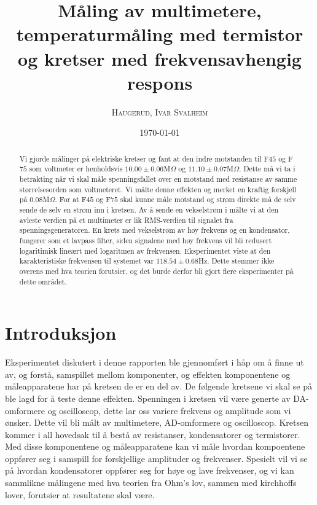 \documentclass[%
 reprint,
 amsmath,amssymb,
 aps,
]{revtex4-1}
\begin{document}

\title{Måling av multimetere, temperaturmåling med termistor\\ og kretser med frekvensavhengig respons}

\author{\textsc{Haugerud, Ivar Svalheim}}
%

\date{\today}

\begin{abstract}
Vi gjorde målinger på elektriske kretser og fant at den indre motstanden til F$45$ og F$75$ som voltmeter er henholdsvis $10.00\pm0.06$M$\Omega$ og $11.10\pm0.07$M$\Omega$. Dette må vi ta i betrakting når vi skal måle spenningsfallet over en motstand med resistanse av samme størrelsesorden som voltmeteret. Vi målte denne effekten og merket en kraftig forskjell på $0.08$M$\Omega$. For at F$45$ og F$75$ skal kunne måle motstand og strøm direkte må de selv sende de selv en strøm inn i kretsen. Av å sende en vekselstrøm i målte vi at den avleste verdien på et multimeter er lik RMS-verdien til signalet fra spenningsgeneratoren. En krets med vekselstrøm av høy frekvens og en kondensator, fungerer som et lavpass filter, siden signalene med høy frekvens vil bli redusert logaritimisk lineært med logaritmen av frekvensen. Eksperimentet viste at den karakteristiske frekvensen til systemet var $118.54 \pm  0.68$Hz. Dette stemmer ikke overens med hva teorien forutsier, og det burde derfor bli gjort flere eksperimenter på dette området.
\end{abstract}

\maketitle

\section{\label{introduksjon}Introduksjon}
Eksperimentet diskutert i denne rapporten ble gjennomført i håp om å finne ut av, og forstå, samspillet mellom komponenter, og effekten komponentene og måleapparatene har på kretsen de er en del av. De følgende kretsene vi skal se på ble lagd for å teste denne effekten. Spenningen i kretsen vil være generte av DA-omformere og oscilloscop, dette lar oss variere frekvens og amplitude som vi ønsker. Dette vil bli målt av multimetere, AD-omformere og oscilloscop. Kretsen kommer i all hovedsak til å bestå av resistanser, kondensatorer og termistorer. Med disse komponentene og måleapparatene kan vi måle hvordan kompoentene oppfører seg i samspill for forskjellige amplituder og frekvenser. Spesielt vil vi se på hvordan kondensatorer oppfører seg for høye og lave frekvenser, og vi kan sammlikne målingene med hva teorien fra Ohm's lov, sammen med kirchhoffs lover, forutsier at resultatene skal være.
\end{document}
